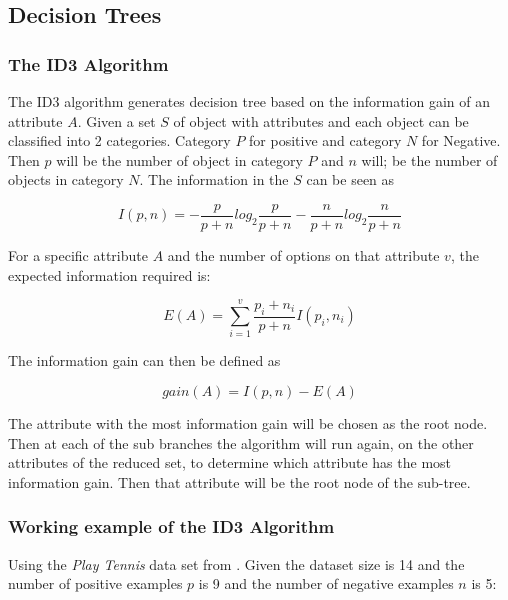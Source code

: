 \documentclass[10pt,a4paper]{article}
\begin{document}
\citep{Michell2009,Riedmiller}

\subsection{Decision Trees}

\subsubsection{The ID3 Algorithm}

The ID3 algorithm generates decision tree based on the information gain of an attribute $A$. Given a set $S$ of object with attributes and each object can be classified into 2 categories. Category $P$ for positive and category $N$ for Negative. Then $p$ will be the number of object in category $P$ and $n$ will; be the number of objects in category $N$. The information in the $S$ can be seen as

\begin{equation}
I(p,n) = -\frac{p}{p+n}log_2\frac{p}{p+n} - \frac{n}{p+n}log_2\frac{n}{p+n} 
\end{equation}

For a specific attribute $A$ and the number of options on that attribute $v$, the expected information required is:

\begin{equation}
E(A) = \sum_{i=1}^v\frac{p_i+n_i}{p+n}I(p_i,n_i)
\end{equation}

The information gain can then be defined as 

\begin{equation}
gain(A) = I(p,n) - E(A)
\end{equation}

The attribute with the most information gain will be chosen as the root node. Then at each of the sub branches the algorithm will run again, on the other attributes of the reduced set, to determine which attribute has the most information gain. Then that attribute will be the root node of the sub-tree.
\citep{Michell2009,Quinlan1986}

\subsubsection{Working example of the ID3 Algorithm}

Using the \emph{Play Tennis} data set from \cite{Quinlan1986}. Given the dataset size is 14 and the number of positive examples $p$ is 9 and the number of negative examples $n$ is 5:
\end{document}
